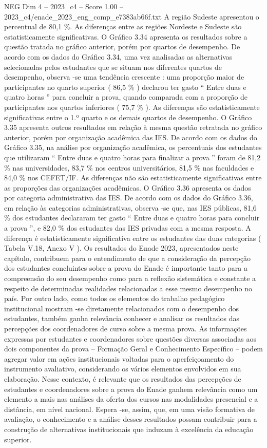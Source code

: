 \begin{textsample}{NEG Dim 4 – 2023\_c4 – Score 1.00 – 2023\_c4/enade\_2023\_eng\_comp\_e7383ab66f.txt}
A região Sudeste apresentou o percentual de 80,1 \%.
As diferenças entre as regiões Nordeste e Sudeste são estatisticamente significativas.
O Gráfico 3.34 apresenta os resultados sobre a questão tratada no gráfico anterior, porém por quartos de desempenho.
De acordo com os dados do Gráfico 3.34, uma vez analisadas as alternativas selecionadas pelos estudantes que se situam nos diferentes quartos de desempenho, observa -se uma tendência crescente : uma proporção maior de participantes no quarto superior ( 86,5 \% ) declarou ter gasto “ Entre duas e quatro horas ” para concluir a prova, quando comparada com a proporção de participantes nos quartos inferiores ( 75,7 \% ).
As diferenças são estatisticamente significativas entre o 1.º quarto e os demais quartos de desempenho.
O Gráfico 3.35 apresenta outros resultados em relação à mesma questão retratada no gráfico anterior, porém por organização acadêmica das IES.
De acordo com os dados do Gráfico 3.35, na análise por organização acadêmica, os percentuais dos estudantes que utilizaram “ Entre duas e quatro horas para finalizar a prova ” foram de 81,2 \% nas universidades, 83,7 \% nos centros universitários, 81,5 \% nas faculdades e 84,0 \% nos CEFET/IF.
As diferenças não são estatisticamente significativas entre as proporções das organizações acadêmicas.
O Gráfico 3.36 apresenta os dados por categoria administrativa das IES.
De acordo com os dados do Gráfico 3.36, em relação às categorias administrativas, observa -se que, nas IES públicas, 81,6 \% dos estudantes declararam ter gasto “ Entre duas e quatro horas para concluir a prova ”, e 82,0 \% dos estudantes das IES privadas com a mesma resposta.
A diferença é estatisticamente significativa entre os estudantes das duas categorias ( Tabela V.18, Anexo V ).
Os resultados do Enade 2023, apresentados neste capítulo, contribuem para o entendimento de que a consideração da percepção dos estudantes concluintes sobre a prova do Enade é importante tanto para a compreensão do seu desempenho como para a reflexão sistemática e constante a respeito de determinadas realidades relacionadas a esse mesmo desempenho no país.
Por outro lado, como todos os elementos do trabalho pedagógico institucional mostram -se diretamente relacionados com o desempenho dos estudantes, também ganha relevância conhecer e analisar os resultados das percepções dos coordenadores de curso sobre a mesma prova.
As informações expressas por estudantes e coordenadores sobre questões diversas associadas aos dois componentes da prova – Formação Geral e Conhecimento Específico – podem agregar valor em ações institucionais voltadas para o aperfeiçoamento do instrumento avaliativo, considerando os vários elementos envolvidos em sua elaboração.
Nesse contexto, é relevante que os resultados das percepções de estudantes e coordenadores sobre a prova do Enade ganhem relevância como um elemento a mais nas análises da oferta dos cursos nas modalidades presencial e a distância, em nível nacional.
Espera -se, assim, que, em uma visão formativa de avaliação, o conhecimento e a análise desses resultados possam contribuir para a construção de alternativas institucionais que induzam à excelência da educação superior.

\end{textsample}
